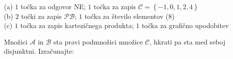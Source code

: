 \documentclass[addpoints,12pt]{exam}
\begin{document}
\begin{questions}

    \begin{solution}[10cm]
        (a) $1$ točka za odgovor NE; $1$ točka za zapis $\mathcal{C}=\left\{-1,0,1,2,4\right\}$ \\
        (b) $2$ točki za zapis $\mathcal{PB}$; $1$ točka za število elementov ($8$) \\
        (c) $1$ točka za zapis kartezičnega produkta; $1$ točka za grafično upodobitev
    \end{solution}


\newpage
    \question[5]
    Množici $\mathcal{A}$ in $\mathcal{B}$ sta pravi podmnožici množice $\mathcal{C}$, hkrati pa sta med seboj disjunktni. Izračunajte:



\end{questions}
\end{document}
